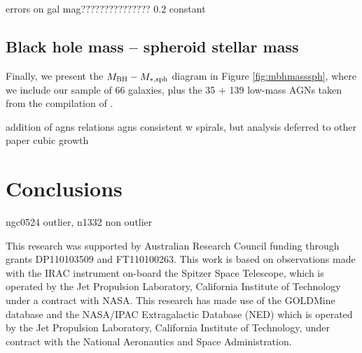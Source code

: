 \documentclass[preprint2]{emulateapj}
\begin{document}
errors on gal mag??????????????? 0.2 constant 

\subsection{Black hole mass -- spheroid stellar mass}
Finally, we present the $M_{\rm BH} - M_{\rm *,sph}$ diagram in Figure \ref{fig:mbhmasssph}, 
where we include our sample of 66 galaxies, 
plus the 35 + 139 low-mass AGNs taken from the compilation of \cite{grahamscott2015}. 

addition of agns
relations
agns consistent w spirals, but analysis deferred to other paper
cubic growth


\section{Conclusions}
\label{sec:concl}
ngc0524 outlier, n1332 non outlier


\acknowledgments
This research was supported by Australian Research Council funding through grants
DP110103509 and FT110100263.
This work is based on observations made with the IRAC instrument \citep{fazio2004IRAC} 
on-board the Spitzer Space Telescope, 
which is operated by the Jet Propulsion Laboratory, 
California Institute of Technology under a contract with NASA.
This research has made use of the GOLDMine database \citep{goldmine} and the NASA/IPAC Extragalactic Database (NED) 
which is operated by the Jet Propulsion Laboratory, California Institute of Technology, 
under contract with the National Aeronautics and Space Administration. 





\clearpage
\end{document}
